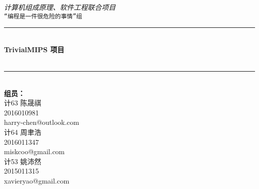 \begin{titlepage}

    \newcommand{\HRule}{\rule{\linewidth}{0.5mm}} %
  
    \vfill
    \center 
    
    \textit{\Large 计算机组成原理、软件工程联合项目}\\[0.5cm] 
    \texttt{\Large “编程是一件很危险的事情”组}
  
  
    \vspace{1.5 cm}
    \HRule \\[0.4cm]
    { \huge \bfseries TrivialMIPS 项目}\\[0.4cm]
    { \huge \bfseries \artname}\\
    \HRule \\[1.5cm]
   
  
    {\Large\textbf{组员：}}\\
    \vspace{.5 cm}
    计63 陈晟祺\\
    2016010981\\
    harry-chen@outlook.com\\
    \vspace{.5 cm}
    计64 周聿浩\\
    2016011347\\
    miskcoo@gmail.com\\
    \vspace{.5 cm}
    计53 姚沛然\\
    2015011315\\
    xavieryao@gmail.com\\
  
  
    \vspace{1.5 cm}
    {\large \artdate}\\[3cm] %
  
  
  \vfill %
  
\end{titlepage}